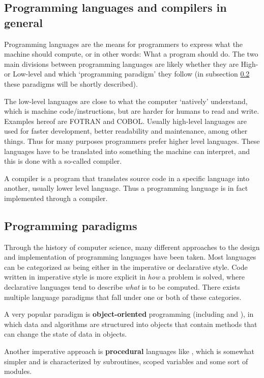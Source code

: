 \subsection{Programming languages and compilers in general}

Programming languages are the means for programmers to express what the machine should compute, or in other words: What a program should do.
The two main divisions between programming languages are likely whether they are High- or Low-level and which `programming paradigm' they follow (in subsection \ref{sec:paradigms} these paradigms will be shortly described).

The low-level languages are close to what the computer `natively' understand, which is machine code/instructions, but are harder for humans to read and write. Examples hereof are FOTRAN and COBOL. Usually high-level languages are used for faster development, better readability and maintenance, among other things. Thus for many purposes programmers prefer higher level languages. These languages have to be translated into something the machine can interpret, and this is done with a so-called compiler.

A compiler is a program that translates source code in a specific language into another, usually lower level language. Thus a programming language is in fact implemented through a compiler.

\subsection{Programming paradigms}
\label{sec:paradigms}
Through the history of computer science, many different approaches to the design and implementation of programming languages have been taken. Most languages can be categorized as being either in the imperative or declarative style. Code written in imperative style is more explicit in \emph{how} a problem is solved, where declarative languages tend to describe \emph{what} is to be computed. There exists multiple language paradigms that fall under one or both of these categories.

A very popular paradigm is \textbf{object-oriented} programming (including  and ), in which data and algorithms are structured into objects that contain methods that can change the state of data in objects.

Another imperative approach is \textbf{procedural} languages like , which is somewhat simpler and is characterized by subroutines, scoped variables and some sort of modules.

